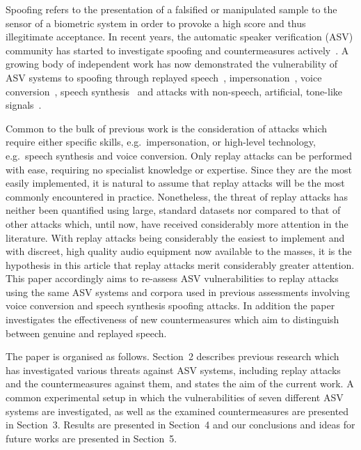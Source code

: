 

Spoofing refers to the presentation of a falsified or manipulated sample 
to the sensor of a biometric system in order to provoke a high score and 
thus illegitimate acceptance.
In recent years, the automatic speaker verification (ASV) community has 
started to investigate spoofing and countermeasures 
actively~\cite{interspeechSpecialSession, handbookChapter, Wu2014a}. 
A growing 
body of independent work has now demonstrated the vulnerability of ASV 
systems to spoofing through 
replayed speech~\cite{Lindberg1999,Villalba2010},
impersonation~\cite{Blomberg2004,Farrus2008}, voice 
conversion~\cite{Perrot2005, Bonastre2007}, speech 
synthesis~\cite{Masuko1999, Leon2010} and attacks with non-speech, 
artificial, tone-like signals~\cite{Alegre2012b}.

Common to the bulk of previous work is the consideration of attacks 
which require either specific skills, e.g.~impersonation, or high-level 
technology, e.g.~speech synthesis and voice conversion. 
Only replay attacks can be performed with ease, requiring no specialist 
knowledge or expertise.  Since they are the most easily 
implemented, it is natural to assume that replay attacks will be the 
most commonly encountered in practice.  Nonetheless, the threat of 
replay attacks has neither been quantified using large, standard 
datasets nor compared to that of other attacks which, until now, have 
received considerably more attention in the literature.
With replay attacks being considerably the easiest to implement
and with discreet, high quality audio equipment now available to the masses,
it is the hypothesis in this article that replay attacks merit
considerably greater attention.
This paper accordingly aims to re-assess ASV vulnerabilities 
to replay attacks using the same ASV systems and corpora used in 
previous assessments involving voice conversion and speech synthesis 
spoofing attacks.  In addition the paper investigates the effectiveness of 
new countermeasures which aim to distinguish between genuine and replayed speech.  

The paper is organised as follows.  Section~2 describes previous research 
which has investigated various threats against ASV systems, including replay attacks and the countermeasures against them, and states the aim of the current work. A common experimental setup in which the vulnerabilities of seven different ASV systems are investigated, as well as the examined countermeasures are presented in Section~3. Results are presented in Section~4 and our conclusions and ideas for future works are presented in Section~5.
